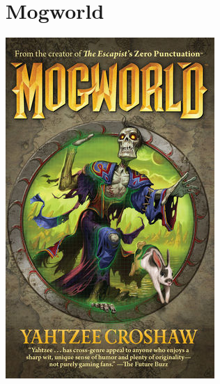\documentclass{tufte-handout}
\makeatletter
\newcommand{\varcaption}[2][0pt]{%
  \gsetlength{\@tufte@caption@vertical@offset}{-#1}%
  \gdef\@tufte@stored@varcaption{#2}%
}
\gdef\@tufte@stored@varcaption{} %
\makeatother
\begin{document}
\section*{Mogworld}
\begin{marginfigure}[5\baselineskip]
   \includegraphics[width=\linewidth]{images/mogworld.jpg}
   \varcaption{\href{https://www.darkhorse.com/Books/16-577/Mogworld}{Publisher Link}, \href{https://www.amazon.com/Mogworld-Yahtzee-Croshaw/dp/1506706355/}{Amazon Link}}
\end{marginfigure}
\end{document}
